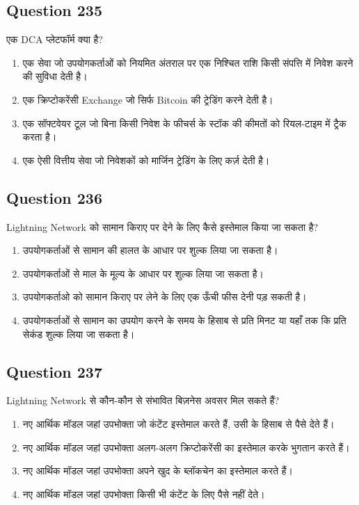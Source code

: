 \documentclass[12pt,a4paper]{article}
\begin{document}
\bigskip


\subsection*{Question 235}
एक DCA प्लेटफॉर्म क्या है?

\begin{enumerate}[label=\Alph*., leftmargin=*]
\item एक सेवा जो उपयोगकर्ताओं को नियमित अंतराल पर एक निश्चित राशि किसी संपत्ति में निवेश करने की सुविधा देती है।
\item एक क्रिप्टोकरेंसी Exchange जो सिर्फ Bitcoin की ट्रेडिंग करने देती है।
\item एक सॉफ्टवेयर टूल जो बिना किसी निवेश के फीचर्स के स्टॉक की कीमतों को रियल-टाइम में ट्रैक करता है।
\item एक ऐसी वित्तीय सेवा जो निवेशकों को मार्जिन ट्रेडिंग के लिए कर्ज़ देती है।
\end{enumerate}

\bigskip


\subsection*{Question 236}
Lightning Network को सामान किराए पर देने के लिए कैसे इस्तेमाल किया जा सकता है?

\begin{enumerate}[label=\Alph*., leftmargin=*]
\item उपयोगकर्ताओं से सामान की हालत के आधार पर शुल्क लिया जा सकता है।
\item उपयोगकर्ताओं से माल के मूल्य के आधार पर शुल्क लिया जा सकता है।
\item उपयोगकर्ताओ को सामान किराए पर लेने के लिए एक ऊँची फीस देनी पड़ सकती है।
\item उपयोगकर्ताओं से सामान का उपयोग करने के समय के हिसाब से प्रति मिनट या यहाँ तक कि प्रति सेकंड शुल्क लिया जा सकता है।
\end{enumerate}

\bigskip


\subsection*{Question 237}
Lightning Network से कौन-कौन से संभावित बिज़नेस अवसर मिल सकते हैं?

\begin{enumerate}[label=\Alph*., leftmargin=*]
\item नए आर्थिक मॉडल जहां उपभोक्ता जो कंटेंट इस्तेमाल करते हैं, उसी के हिसाब से पैसे देते हैं।
\item नए आर्थिक मॉडल जहां उपभोक्ता अलग-अलग क्रिप्टोकरेंसी का इस्तेमाल करके भुगतान करते हैं।
\item नए आर्थिक मॉडल जहां उपभोक्ता अपने खुद के ब्लॉकचेन का इस्तेमाल करते हैं।
\item नए आर्थिक मॉडल जहां उपभोक्ता किसी भी कंटेंट के लिए पैसे नहीं देते।
\end{enumerate}
\end{document}
